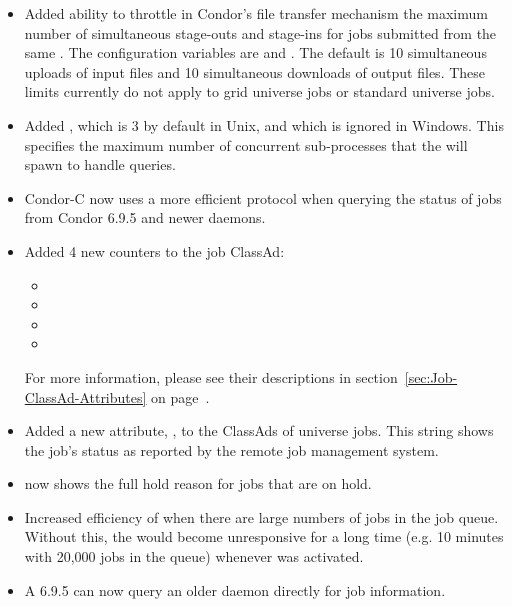 \begin{itemize}
\item Added ability to throttle in Condor's file transfer mechanism
the maximum number of simultaneous stage-outs and stage-ins for jobs
submitted from the same .  The configuration variables
are  and
.  The default is 10 simultaneous
uploads of input files and 10 simultaneous downloads of output files.
These limits currently do not apply to grid universe jobs or standard
universe jobs.

\item Added , which is 3 by default in
Unix, and which is ignored in Windows.  This specifies the maximum
number of concurrent sub-processes that the  will spawn
to handle queries.

\item Condor-C now uses a more efficient protocol when querying the
status of jobs from Condor 6.9.5 and newer  daemons.

\item Added 4 new counters to the job ClassAd:
 \begin{itemize}
 \item {}
 \item {}
 \item {}
 \item {}
 \end{itemize}
For more information, please see their descriptions in
section~\ref{sec:Job-ClassAd-Attributes} on page~\pageref{sec:Job-ClassAd-Attributes}.

\item Added a new attribute, , to the ClassAds of
 universe jobs. This string shows the job's status as reported
by the remote job management system.

\item {}  now shows the full hold reason for jobs
that are on hold.

\item Increased efficiency of  when there are large
numbers of jobs in the job queue.  Without this, the 
would become unresponsive for a long time (e.g. 10 minutes with 20,000
jobs in the queue) whenever  was activated.

\item A 6.9.5  can now query an older  daemon directly 
for job information.


\end{itemize}
